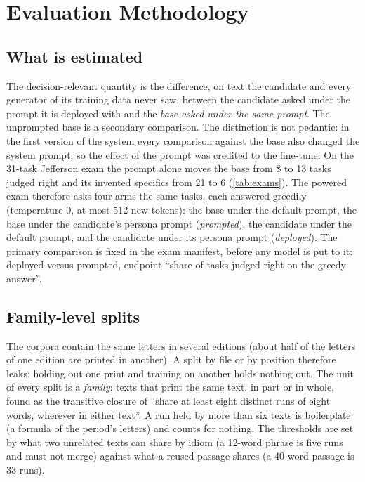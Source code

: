 
\section{Evaluation Methodology}\label{sec:eval}

\subsection{What is estimated}

The decision-relevant quantity is the difference, on text the candidate and every
generator of its training data never saw, between the candidate asked under the prompt it is
deployed with and the \emph{base asked under the same prompt}. The unprompted base is
a secondary comparison. The distinction is not pedantic: in the first version of the
system every comparison against the base also changed the system prompt, so the effect of the
prompt was credited to the fine-tune. On the 31-task Jefferson exam the prompt alone moves the
base from 8 to 13 tasks judged right and its invented specifics from 21 to 6 (\cref{tab:exams}).
The powered exam therefore asks four arms the same tasks, each answered greedily
(temperature 0, at most 512 new tokens): the base under the default prompt, the base under the candidate's
persona prompt (\emph{prompted}), the candidate under the default prompt, and the candidate
under its persona prompt (\emph{deployed}). The primary comparison is fixed in the exam
manifest, before any model is put to it: deployed versus prompted, endpoint ``share of
tasks judged right on the greedy answer''.

\subsection{Family-level splits}\label{sec:split}

The corpora contain the same letters in several editions (about half of the letters of one
edition are printed in another). A split by file or by position therefore leaks: holding out
one print and training on another holds nothing out. The unit of every split is a
\emph{family}: texts that print the same text, in part or in whole, found as the transitive
closure of ``share at least eight distinct runs of eight words, wherever in either
text''. A run held by more than six texts is boilerplate (a formula of the period's
letters) and counts for nothing. The thresholds are set by what two unrelated texts can share by
idiom (a 12-word phrase is five runs and must not merge) against what a reused passage shares
(a 40-word passage is 33 runs).

